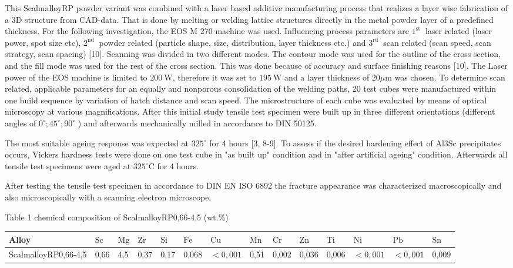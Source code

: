 \documentclass[10pt]{article}
\begin{document}
This ScalmalloyRP powder variant was combined with a laser based additive manufacturing process that realizes a layer wise fabrication of a 3D structure from CAD-data. That is done by melting or welding lattice structures directly in the metal powder layer of a predefined thickness. For the following investigation, the EOS M 270 machine was used. Influencing process parameters are $1^{\text {st }}$ laser related (laser power, spot size etc), $2^{\text {nd }}$ powder related (particle shape, size, distribution, layer thickness etc.) and $3^{\text {rd }}$ scan related (scan speed, scan strategy, scan spacing) [10]. Scanning was divided in two different modes. The contour mode was used for the outline of the cross section, and the fill mode was used for the rest of the cross section. This was done because of accuracy and surface finishing reasons [10]. The Laser power of the EOS machine is limited to $200 \mathrm{~W}$, therefore it was set to $195 \mathrm{~W}$ and a layer thickness of $20 \mu \mathrm{m}$ was chosen. To determine scan related, applicable parameters for an equally and nonporous consolidation of the welding paths, 20 test cubes were manufactured within one build sequence by variation of hatch distance and scan speed. The microstructure of each cube was evaluated by means of optical microscopy at various magnifications. After this initial study tensile test specimen were built up in three different orientations (different angles of $0^{\circ} ; 45^{\circ} ; 90^{\circ}$ ) and afterwards mechanically milled in accordance to DIN 50125.

The most suitable ageing response was expected at $325^{\circ}$ for 4 hours [3, 8-9]. To assess if the desired hardening effect of Al3Sc precipitates occurs, Vickers hardness tests were done on one test cube in "as built up" condition and in "after artificial ageing" condition. Afterwards all tensile test specimens were aged at $325^{\circ} \mathrm{C}$ for 4 hours.

After testing the tensile test specimen in accordance to DIN EN ISO 6892 the fracture appearance was characterized macroscopically and also microscopically with a scanning electron microscope.

Table 1 chemical composition of ScalmalloyRP0,66-4,5 (wt.\%)

\begin{center}
\begin{tabular}{llllllllllllll}
\hline
Alloy & $\mathrm{Sc}$ & $\mathrm{Mg}$ & $\mathrm{Zr}$ & $\mathrm{Si}$ & $\mathrm{Fe}$ & $\mathrm{Cu}$ & $\mathrm{Mn}$ & $\mathrm{Cr}$ & $\mathrm{Zn}$ & $\mathrm{Ti}$ & $\mathrm{Ni}$ & $\mathrm{Pb}$ & $\mathrm{Sn}$ \\
\hline
ScalmalloyRP0,66-4,5 & 0,66 & 4,5 & 0,37 & 0,17 & 0,068 & $<0,001$ & 0,51 & 0,002 & 0,036 & 0,006 & $<0,001$ & $<0,001$ & 0,009 \\
\hline
\end{tabular}
\end{center}
\end{document}
